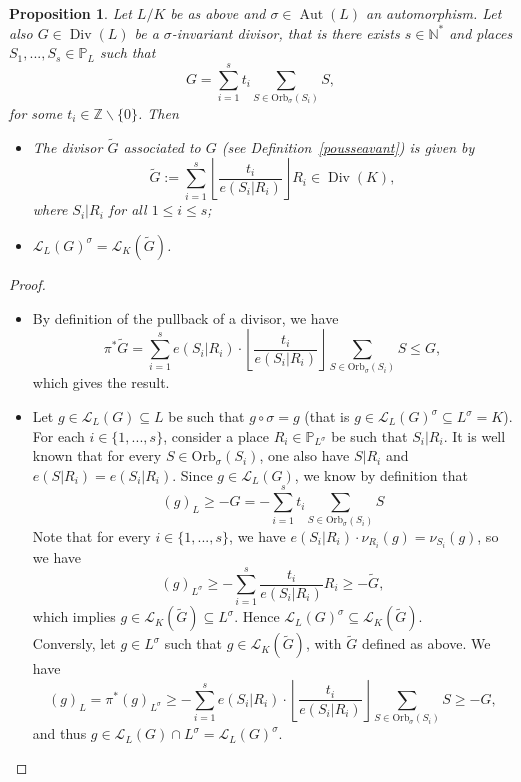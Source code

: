 \documentclass[10pt]{article}
\newtheorem{prop1}[thm]{Proposition}
\theoremstyle{definition}
\theoremstyle{definition}
\theoremstyle{definition}
\newcommand{\s}{\vspace{0.3cm}}
\newcommand{\cd}{\cdot}
\newcommand{\N}{\mathbb{N}}
\newcommand{\Z}{\mathbb{Z}}
\newcommand{\PP}{\mathbb{P}}
\newcommand{\su}{\subseteq}
\newcommand{\Div}{\operatorname{Div}}
\newcommand{\Aut}{\operatorname{Aut}}
\newcommand{\calL}{\mathcal{L}}
\begin{document}
\s

\begin{prop1} \label{invrr}
Let $L/K$ be as above and $\sigma \in \Aut(L)$ an automorphism. Let also $G \in \Div(L)$ be a $\sigma$-invariant divisor, that is there exists $s \in \N^*$ and places $S_1,...,S_s \in \PP_L$ such that 
\[G = \sum\limits_{i=1}^s t_i \sum\limits_{S \in \mathrm{Orb}_{\sigma}(S_i)} S,\]
for some $t_i \in \Z \backslash \{0\}$. Then
\begin{itemize}
\item[(i)] The divisor $\tilde{G}$ associated to $G$ (see Definition~\ref{pousseavant}) is given by
\[\tilde{G}:= \sum\limits_{i=1}^s \left\lfloor\dfrac{t_i}{e(S_i|R_i)}\right\rfloor  R_i \in \Div(K),\]
where $S_i|R_i$ for all $1 \leq i \leq s$;
\item[(ii)]  $\calL_L(G)^{\sigma} = \calL_K(\tilde{G})$.
\end{itemize}
\end{prop1}

\s

\begin{proof}
\begin{itemize}
\item[$(i)$] By definition of the pullback of a divisor, we have
\[\pi^*\tilde{G} = \sum\limits_{i=1}^s e(S_i|R_i) \cd \left\lfloor\dfrac{t_i}{e(S_i|R_i)}\right\rfloor \sum\limits_{S \in \mathrm{Orb}_{\sigma}(S_i)} S \leq G,\]
which gives the result. 
\item[$(ii)$] Let $g \in \calL_L(G) \su L$ be such that $g \circ \sigma = g$ (that is $g \in \calL_L(G)^{\sigma} \su L^{\sigma}=K$). For each $i \in \{1,...,s\}$, consider a place $R_i \in \PP_{L^{\sigma}}$ be such that $S_i|R_i$. It is well known that for every $S \in \mathrm{Orb}_{\sigma}(S_i)$, one also have $S|R_i$ and $e(S|R_i)=e(S_i|R_i)$. Since $g \in \calL_L(G)$, we know by definition that
\[(g)_L \geq -G=- \sum\limits_{i=1}^s t_i \sum\limits_{S \in \mathrm{Orb}_{\sigma}(S_i)} S\]
Note that for every $i \in \{1,...,s\}$, we have $e(S_i|R_i) \cd \nu_{R_i}(g) = \nu_{S_i}(g)$, so we have 
\[(g)_{L^{\sigma}} \geq - \sum\limits_{i=1}^s \dfrac{t_i}{e(S_i|R_i)}  R_i \geq - \tilde{G},\]
which implies $g \in \calL_K(\tilde{G}) \su L^{\sigma}$. Hence $\calL_L(G)^{\sigma} \su \calL_K(\tilde{G})$. \\
Conversly, let $g \in L^{\sigma}$ such that $g \in \calL_K(\tilde{G})$, with $\tilde{G}$ defined as above. We have 
\[ (g)_L = \pi^*(g)_{L^{\sigma}} \geq -\sum\limits_{i=1}^s e(S_i|R_i) \cd \left\lfloor\dfrac{t_i}{e(S_i|R_i)}\right\rfloor \sum\limits_{S \in \mathrm{Orb}_{\sigma}(S_i)} S \geq -G,\]
and thus $g \in \calL_L(G) \cap L^{\sigma} = \calL_L(G)^{\sigma}$.
\end{itemize}
\end{proof}
\color{black}
\s
\end{document}
